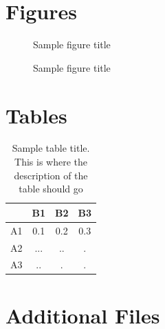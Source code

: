 \documentclass{bmcart}
\begin{document}
{\begin{backmatter}



\section*{Figures}
  \begin{figure}[h!]
  \caption{Sample figure title}
\end{figure}

\begin{figure}[h!]
  \caption{Sample figure title}
\end{figure}


\section*{Tables}
\begin{table}[h!]
\caption{Sample table title. This is where the description of the table should go}
  \begin{tabular}{cccc}
    \hline
    & B1  &B2   & B3\\ \hline
    A1 & 0.1 & 0.2 & 0.3\\
    A2 & ... & ..  & .\\
    A3 & ..  & .   & .\\ \hline
  \end{tabular}
\end{table}


\section*{Additional Files}

\end{backmatter}}
\end{document}
